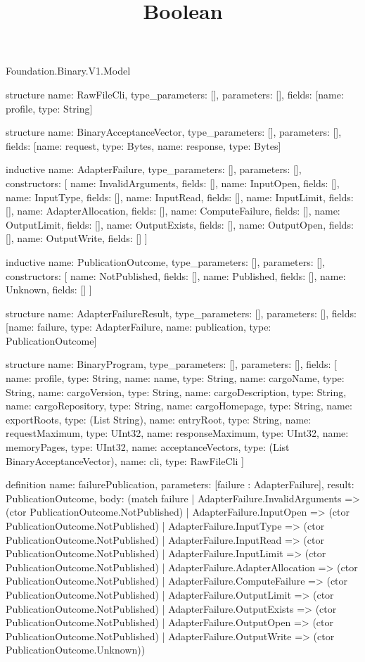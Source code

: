 \begin{lexlean}{Foundation.Binary.V1.Model}
\title{Boolean}
\begin{semanticmodule}
structure{
  name: RawFileCli,
  type_parameters: [],
  parameters: [],
  fields: [{name: profile, type: String}]
}

structure{
  name: BinaryAcceptanceVector,
  type_parameters: [],
  parameters: [],
  fields: [{name: request, type: Bytes}, {name: response, type: Bytes}]
}

inductive{
  name: AdapterFailure,
  type_parameters: [],
  parameters: [],
  constructors: [
    {name: InvalidArguments, fields: []},
    {name: InputOpen, fields: []},
    {name: InputType, fields: []},
    {name: InputRead, fields: []},
    {name: InputLimit, fields: []},
    {name: AdapterAllocation, fields: []},
    {name: ComputeFailure, fields: []},
    {name: OutputLimit, fields: []},
    {name: OutputExists, fields: []},
    {name: OutputOpen, fields: []},
    {name: OutputWrite, fields: []}
  ]
}

inductive{
  name: PublicationOutcome,
  type_parameters: [],
  parameters: [],
  constructors: [
    {name: NotPublished, fields: []},
    {name: Published, fields: []},
    {name: Unknown, fields: []}
  ]
}

structure{
  name: AdapterFailureResult,
  type_parameters: [],
  parameters: [],
  fields: [{name: failure, type: AdapterFailure}, {name: publication, type: PublicationOutcome}]
}

structure{
  name: BinaryProgram,
  type_parameters: [],
  parameters: [],
  fields: [
    {name: profile, type: String},
    {name: name, type: String},
    {name: cargoName, type: String},
    {name: cargoVersion, type: String},
    {name: cargoDescription, type: String},
    {name: cargoRepository, type: String},
    {name: cargoHomepage, type: String},
    {name: exportRoots, type: (List String)},
    {name: entryRoot, type: String},
    {name: requestMaximum, type: UInt32},
    {name: responseMaximum, type: UInt32},
    {name: memoryPages, type: UInt32},
    {name: acceptanceVectors, type: (List BinaryAcceptanceVector)},
    {name: cli, type: RawFileCli}
  ]
}

definition{
  name: failurePublication,
  parameters: [failure : AdapterFailure],
  result: PublicationOutcome,
  body: (match failure
    | AdapterFailure.InvalidArguments => (ctor PublicationOutcome.NotPublished)
    | AdapterFailure.InputOpen => (ctor PublicationOutcome.NotPublished)
    | AdapterFailure.InputType => (ctor PublicationOutcome.NotPublished)
    | AdapterFailure.InputRead => (ctor PublicationOutcome.NotPublished)
    | AdapterFailure.InputLimit => (ctor PublicationOutcome.NotPublished)
    | AdapterFailure.AdapterAllocation => (ctor PublicationOutcome.NotPublished)
    | AdapterFailure.ComputeFailure => (ctor PublicationOutcome.NotPublished)
    | AdapterFailure.OutputLimit => (ctor PublicationOutcome.NotPublished)
    | AdapterFailure.OutputExists => (ctor PublicationOutcome.NotPublished)
    | AdapterFailure.OutputOpen => (ctor PublicationOutcome.NotPublished)
    | AdapterFailure.OutputWrite => (ctor PublicationOutcome.Unknown))
}


\end{semanticmodule}
\end{lexlean}

